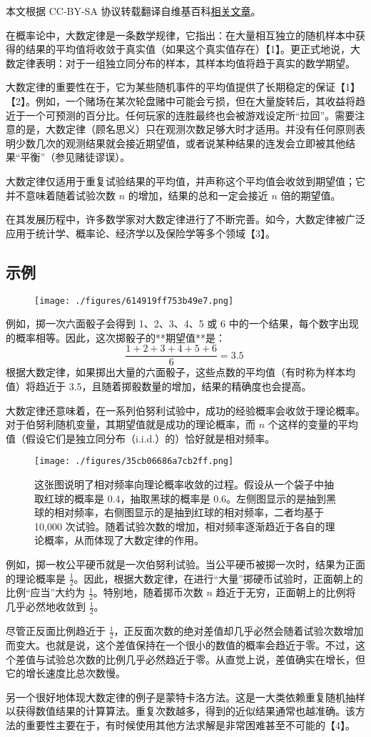 
本文根据 CC-BY-SA 协议转载翻译自维基百科\href{https://en.wikipedia.org/wiki/Law_of_large_numbers}{相关文章}。

在概率论中，大数定律是一条数学规律，它指出：在大量相互独立的随机样本中获得的结果的平均值将收敛于真实值（如果这个真实值存在）【1】。更正式地说，大数定律表明：对于一组独立同分布的样本，其样本均值将趋于真实的数学期望。

大数定律的重要性在于，它为某些随机事件的平均值提供了长期稳定的保证【1】【2】。例如，一个赌场在某次轮盘赌中可能会亏损，但在大量旋转后，其收益将趋近于一个可预测的百分比。任何玩家的连胜最终也会被游戏设定所“拉回”。需要注意的是，大数定律（顾名思义）只在观测次数足够大时才适用。并没有任何原则表明少数几次的观测结果就会接近期望值，或者说某种结果的连发会立即被其他结果“平衡”（参见赌徒谬误）。

大数定律仅适用于重复试验结果的平均值，并声称这个平均值会收敛到期望值；它并不意味着随着试验次数 $n$ 的增加，结果的总和一定会接近 $n$ 倍的期望值。

在其发展历程中，许多数学家对大数定律进行了不断完善。如今，大数定律被广泛应用于统计学、概率论、经济学以及保险学等多个领域【3】。
\subsection{示例}
\begin{figure}[ht]
\centering
\texttt{[image: ./figures/614919ff753b49e7.png]}
\caption{} \label{fig_DSdl_1}
\end{figure}
例如，掷一次六面骰子会得到 1、2、3、4、5 或 6 中的一个结果，每个数字出现的概率相等。因此，这次掷骰子的**期望值**是：
$$
\frac{1 + 2 + 3 + 4 + 5 + 6}{6} = 3.5~
$$
根据大数定律，如果掷出大量的六面骰子，这些点数的平均值（有时称为样本均值）将趋近于 3.5，且随着掷骰数量的增加，结果的精确度也会提高。

大数定律还意味着，在一系列伯努利试验中，成功的经验概率会收敛于理论概率。对于伯努利随机变量，其期望值就是成功的理论概率，而 $n$ 个这样的变量的平均值（假设它们是独立同分布（i.i.d.）的）恰好就是相对频率。
\begin{figure}[ht]
\centering
\texttt{[image: ./figures/35cb06686a7cb2ff.png]}
\caption{这张图说明了相对频率向理论概率收敛的过程。假设从一个袋子中抽取红球的概率是 0.4，抽取黑球的概率是 0.6。左侧图显示的是抽到黑球的相对频率，右侧图显示的是抽到红球的相对频率，二者均基于 10,000 次试验。随着试验次数的增加，相对频率逐渐趋近于各自的理论概率，从而体现了大数定律的作用。} \label{fig_DSdl_2}
\end{figure}
例如，掷一枚公平硬币就是一次伯努利试验。当公平硬币被掷一次时，结果为正面的理论概率是 $\frac{1}{2}$。因此，根据大数定律，在进行“大量”掷硬币试验时，正面朝上的比例“应当”大约为 $\frac{1}{2}$。特别地，随着掷币次数 $n$ 趋近于无穷，正面朝上的比例将几乎必然地收敛到 $\frac{1}{2}$。

尽管正反面比例趋近于 $\frac{1}{2}$，正反面次数的绝对差值却几乎必然会随着试验次数增加而变大。也就是说，这个差值保持在一个很小的数值的概率会趋近于零。不过，这个差值与试验总次数的比例几乎必然趋近于零。从直觉上说，差值确实在增长，但它的增长速度比总次数慢。

另一个很好地体现大数定律的例子是蒙特卡洛方法。这是一大类依赖重复随机抽样以获得数值结果的计算算法。重复次数越多，得到的近似结果通常也越准确。该方法的重要性主要在于，有时候使用其他方法求解是非常困难甚至不可能的【4】。

